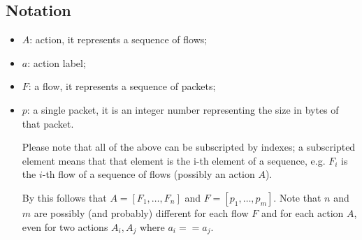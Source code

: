 \subsection{Notation}
\label{subsec:notation}
\begin{itemize}
 \item $ A $: action, it represents a sequence of flows;
 \item $ a $: action label;
 \item $ F $: a flow, it represents a sequence of packets;
 \item $ p $: a single packet, it is an integer number representing the size in bytes of that packet.
 
 Please note that all of the above can be subscripted by indexes; a subscripted element means that that element is the i-th element of a sequence, e.g. $F_i$ is the $i$-th flow of a sequence of flows (possibly an action $A$). 
 
 By this follows that $A = [F_1, \dots, F_n]$ and $F = [p_1,\dots, p_m]$. Note that $n$ and $m$ are possibly (and probably) different for each flow $F$ and for each action $A$, even for two actions $A_i, A_j$ where $a_i == a_j$.
\end{itemize}
